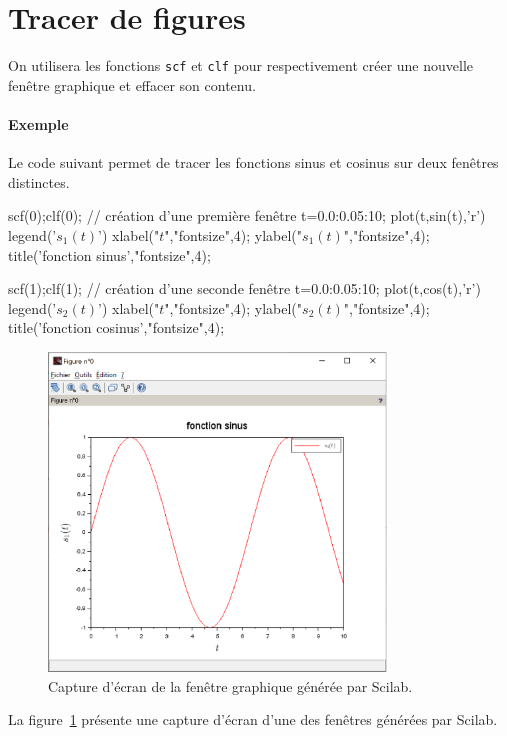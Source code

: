 \section{Tracer de figures}
On utilisera les fonctions \verb?scf? et \verb?clf?  pour respectivement
créer une nouvelle fenêtre graphique et effacer son contenu. 
\paragraph{Exemple}
Le code suivant permet de tracer les fonctions sinus et cosinus sur deux 
fenêtres distinctes. 
\begin{Scilabcode}
scf(0);clf(0); // création d'une première fenêtre
t=0.0:0.05:10; 
plot(t,sin(t),'r')
legend('$s_1(t)$')
xlabel("$t$","fontsize",4);
ylabel("$s_1(t)$","fontsize",4);
title('fonction sinus',"fontsize",4);

scf(1);clf(1); // création d'une seconde fenêtre    
t=0.0:0.05:10;
plot(t,cos(t),'r')
legend('$s_2(t)$')
xlabel("$t$","fontsize",4);
ylabel("$s_2(t)$","fontsize",4);
title('fonction cosinus',"fontsize",4);  
\end{Scilabcode}
\begin{figure}[!ht]
    \centering
    \includegraphics[width=0.8\textwidth]{fig/capture_SCILAB.eps}
    \caption{Capture d'écran de la fenêtre graphique générée 
             par Scilab.\label{fig-capture-SCILAB}}
\end{figure}
La figure~\cref{fig-capture-SCILAB} présente une capture d'écran 
d'une des fenêtres générées par Scilab.
          
